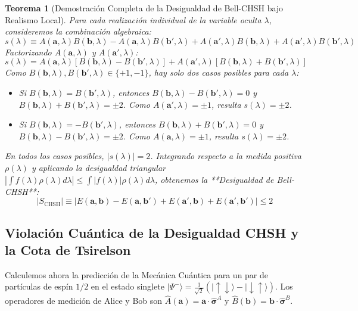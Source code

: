 \documentclass[11pt,a4paper]{book}
\newtheorem{teorema}{Teorema}[chapter]
\begin{document}
\begin{teorema}[Demostración Completa de la Desigualdad de Bell-CHSH bajo Realismo Local]
Para cada realización individual de la variable oculta $\lambda$, consideremos la combinación algebraica:
\begin{equation}
s(\lambda) \equiv A(\mathbf{a}, \lambda)B(\mathbf{b}, \lambda) - A(\mathbf{a}, \lambda)B(\mathbf{b}', \lambda) + A(\mathbf{a}', \lambda)B(\mathbf{b}, \lambda) + A(\mathbf{a}', \lambda)B(\mathbf{b}', \lambda)
\end{equation}
Factorizando $A(\mathbf{a}, \lambda)$ y $A(\mathbf{a}', \lambda)$:
\begin{equation}
s(\lambda) = A(\mathbf{a}, \lambda)\left[ B(\mathbf{b}, \lambda) - B(\mathbf{b}', \lambda) \right] + A(\mathbf{a}', \lambda)\left[ B(\mathbf{b}, \lambda) + B(\mathbf{b}', \lambda) \right]
\end{equation}
Como $B(\mathbf{b}, \lambda), B(\mathbf{b}', \lambda) \in \{+1, -1\}$, hay solo dos casos posibles para cada $\lambda$:
\begin{itemize}
    \item Si $B(\mathbf{b}, \lambda) = B(\mathbf{b}', \lambda)$, entonces $B(\mathbf{b}, \lambda) - B(\mathbf{b}', \lambda) = 0$ y $B(\mathbf{b}, \lambda) + B(\mathbf{b}', \lambda) = \pm 2$. Como $A(\mathbf{a}', \lambda) = \pm 1$, resulta $s(\lambda) = \pm 2$.
    \item Si $B(\mathbf{b}, \lambda) = -B(\mathbf{b}', \lambda)$, entonces $B(\mathbf{b}, \lambda) + B(\mathbf{b}', \lambda) = 0$ y $B(\mathbf{b}, \lambda) - B(\mathbf{b}', \lambda) = \pm 2$. Como $A(\mathbf{a}, \lambda) = \pm 1$, resulta $s(\lambda) = \pm 2$.
\end{itemize}
En todos los casos posibles, $|s(\lambda)| = 2$. Integrando respecto a la medida positiva $\rho(\lambda)$ y aplicando la desigualdad triangular $| \int f(\lambda)\rho(\lambda)d\lambda | \leq \int |f(\lambda)|\rho(\lambda)d\lambda$, obtenemos la **Desigualdad de Bell-CHSH**:
\begin{equation}
\boxed{ |S_{\text{CHSH}}| \equiv \left| E(\mathbf{a}, \mathbf{b}) - E(\mathbf{a}, \mathbf{b}') + E(\mathbf{a}', \mathbf{b}) + E(\mathbf{a}', \mathbf{b}') \right| \leq 2 }
\end{equation}
\end{teorema}

\subsection{Violación Cuántica de la Desigualdad CHSH y la Cota de Tsirelson}

Calculemos ahora la predicción de la Mecánica Cuántica para un par de partículas de espín $1/2$ en el estado singlete $|\Psi^-\rangle = \frac{1}{\sqrt{2}}(|\uparrow\downarrow\rangle - |\downarrow\uparrow\rangle)$. Los operadores de medición de Alice y Bob son $\hat{A}(\mathbf{a}) = \mathbf{a}\cdot\hat{\bm{\sigma}}^A$ y $\hat{B}(\mathbf{b}) = \mathbf{b}\cdot\hat{\bm{\sigma}}^B$.
\end{document}
